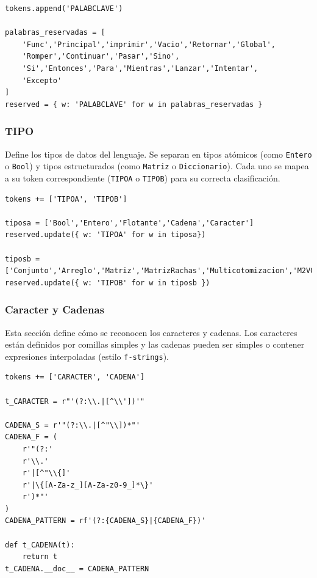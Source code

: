 \documentclass{article}
\begin{document}
\begin{lstlisting}[style=mypython]
tokens.append('PALABCLAVE')

palabras_reservadas = [
    'Func','Principal','imprimir','Vacio','Retornar','Global',
    'Romper','Continuar','Pasar','Sino',
    'Si','Entonces','Para','Mientras','Lanzar','Intentar',
    'Excepto'
]
reserved = { w: 'PALABCLAVE' for w in palabras_reservadas }
\end{lstlisting}

\subsubsection{TIPO}

Define los tipos de datos del lenguaje. Se separan en tipos atómicos (como \texttt{Entero} o \texttt{Bool}) y tipos estructurados (como \texttt{Matriz} o \texttt{Diccionario}). Cada uno se mapea a su token correspondiente (\texttt{TIPOA} o \texttt{TIPOB}) para su correcta clasificación.

\begin{lstlisting}[style=mypython]
tokens += ['TIPOA', 'TIPOB']

tiposa = ['Bool','Entero','Flotante','Cadena','Caracter']
reserved.update({ w: 'TIPOA' for w in tiposa})

tiposb = ['Conjunto','Arreglo','Matriz','MatrizRachas','Multicotomizacion','M2VClasificacion','Diccionario']
reserved.update({ w: 'TIPOB' for w in tiposb })
\end{lstlisting}

\subsubsection{Caracter y Cadenas}

Esta sección define cómo se reconocen los caracteres y cadenas. Los caracteres están definidos por comillas simples y las cadenas pueden ser simples o contener expresiones interpoladas (estilo \texttt{f-strings}).

\begin{lstlisting}[style=mypython]
tokens += ['CARACTER', 'CADENA']

t_CARACTER = r"'(?:\\.|[^\\'])'"

CADENA_S = r'"(?:\\.|[^"\\])*"'
CADENA_F = (
    r'"(?:'
    r'\\.'
    r'|[^"\\{]'
    r'|\{[A-Za-z_][A-Za-z0-9_]*\}'
    r')*"'
)
CADENA_PATTERN = rf'(?:{CADENA_S}|{CADENA_F})'

def t_CADENA(t):
    return t
t_CADENA.__doc__ = CADENA_PATTERN
\end{lstlisting}
\end{document}
